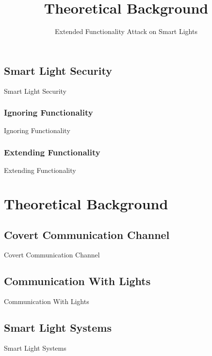\documentclass[11pt,t,usepdftitle=false,aspectratio=169]{beamer}
\begin{document}
\subsection{Smart Light Security} %
\label{sub:smart_light_security}
\begin{frame}{Smart Light Security}

\end{frame}

\subsubsection{Ignoring Functionality} %
\label{subsub:ignoring}
\begin{frame}{Ignoring Functionality}
	
\end{frame}

\subsubsection{Extending Functionality} %
\label{subsub:extending}
\begin{frame}{Extending Functionality}
	
\end{frame}


\section{Theoretical Background} %
\label{sec:theory}
\title{Theoretical Background}
\subtitle{Extended Functionality Attack on Smart Lights}

\subsection{Covert Communication Channel} %
\label{sub:covert_channel}
\begin{frame}{Covert Communication Channel}

\end{frame}

\subsection{Communication With Lights} %
\label{sub:light_communication}
\begin{frame}{Communication With Lights}

\end{frame}

\subsection{Smart Light Systems} %
\label{sub:smart_lights}
\begin{frame}{Smart Light Systems}
  
\end{frame}
\end{document}
